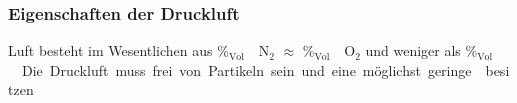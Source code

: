\begin{frame}
  \frametitle{Eigenschaften der Druckluft}
  Luft besteht im Wesentlichen aus \unit[79]{\%$_\mathrm{Vol}$} 
   N$_2$
  $\approx$ \unit[21]{\%$_\mathrm{Vol}$}   O$_2$ und 
  weniger als  \unit[1]{\%$_\mathrm{Vol}$}  . 
  Die Druckluft muss frei von Partikeln sein und eine möglichst geringe
   besitzen.  
  
  \ifteacher%
  \else%
    \vspace*{-0.10\baselineskip}\rotatebox[origin=lB]{180}{%
    \resizebox{0.9\linewidth}{!}{\parbox[t]{3.95\linewidth}{%
  Stickstoff, Sauerstoff, Edelgase, Luftfeuchtigkeit
    }}}
  \fi%


\end{frame}


